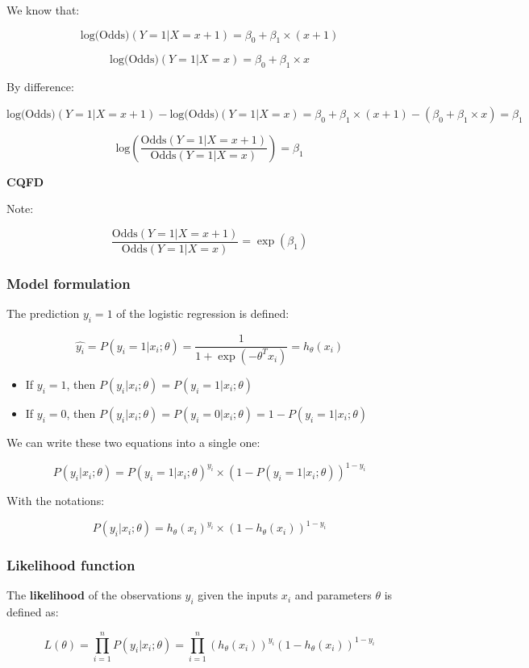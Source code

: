 \documentclass{article}
\providecommand{\tightlist}{%
  \setlength{\itemsep}{0pt}\setlength{\parskip}{0pt}}
\begin{document}
We know that:

\[\text{log(Odds)}(Y=1|X=x+1)=\beta_0 + \beta_1 \times (x+1)\]

\[\text{log(Odds)}(Y=1|X=x)=\beta_0 + \beta_1 \times x\]

By difference:

\[\text{log(Odds)}(Y=1|X=x+1) - \text{log(Odds)}(Y=1|X=x) =\beta_0 + \beta_1 \times (x+1) - (\beta_0 + \beta_1 \times x) = \beta_1\]

\[\text{log}\left(\dfrac{\text{Odds}(Y=1|X=x+1)}{\text{Odds}(Y=1|X=x)}\right) =\beta_1\]

\textbf{CQFD}

Note:

\[\dfrac{\text{Odds}(Y=1|X=x+1)}{\text{Odds}(Y=1|X=x)} = \exp(\beta_1)\]

\subsubsection{Model formulation}\label{model-formulation}

The prediction \(y_i=1\) of the logistic regression is defined:

\[\hat{y_i} = P(y_i=1 | x_i; \theta) = \frac{1}{1 + \exp(-\theta^Tx_i)} = h_{\theta}(x_i)\]

\begin{itemize}
\tightlist
\item
  If \(y_i=1\), then \(P(y_i|x_i; \theta)=P(y_i=1|x_i; \theta)\)
\item
  If \(y_i=0\), then
  \(P(y_i|x_i; \theta)=P(y_i=0|x_i; \theta) = 1 - P(y_i=1|x_i; \theta)\)
\end{itemize}

We can write these two equations into a single one:

\[P(y_i|x_i; \theta)=P(y_i=1|x_i; \theta)^{y_i}\times (1 - P(y_i=1|x_i; \theta))^{1-y_i}\]

With the notations:

\[P(y_i|x_i; \theta)=h_{\theta}(x_i)^{y_i}\times (1 - h_{\theta}(x_i))^{1-y_i}\]

\subsubsection{Likelihood function}\label{likelihood-function}

The \textbf{likelihood} of the observations \(y_i\) given the inputs
\(x_i\) and parameters \(\theta\) is defined as:

\[L(\theta) = \prod_{i=1}^n P(y_i|x_i;\theta) = \prod_{i=1}^n (h_{\theta}(x_i))^{y_i} (1 -h_{\theta}(x_i))^{1-y_i}\]
\end{document}
